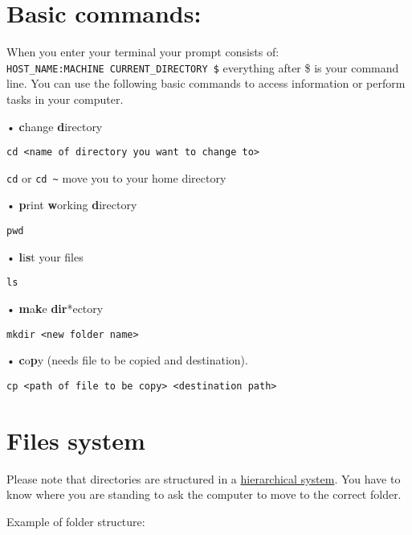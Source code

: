 \documentclass[
]{book}
\begin{document}
\hypertarget{basic-commands}{%
\section{Basic commands:}\label{basic-commands}}

When you enter your terminal your prompt consists of: \texttt{HOST\_NAME:MACHINE\ CURRENT\_DIRECTORY\ \$} everything after \$ is your command line. You can use the following basic commands to access information or perform tasks in your computer.

• \textbf{c}hange \textbf{d}irectory

\begin{verbatim}
cd <name of directory you want to change to>
\end{verbatim}

\texttt{cd} or \texttt{cd\ \textasciitilde{}} move you to your home directory

• \textbf{p}rint \textbf{w}orking \textbf{d}irectory

\begin{verbatim}
pwd
\end{verbatim}

• \textbf{l}i\textbf{s}t your files

\begin{verbatim}
ls
\end{verbatim}

• \textbf{m}a\textbf{k}e \textbf{dir}*ectory

\begin{verbatim}
mkdir <new folder name>
\end{verbatim}

• \textbf{c}o\textbf{p}y (needs file to be copied and destination).

\begin{verbatim}
cp <path of file to be copy> <destination path>
\end{verbatim}

\hypertarget{files-system}{%
\section{Files system}\label{files-system}}

Please note that directories are structured in a \href{https://www.geeksforgeeks.org/structures-of-directory-in-operating-system/}{hierarchical system}. You have to know where you are standing to ask the computer to move to the correct folder.

Example of folder structure:
\end{document}
